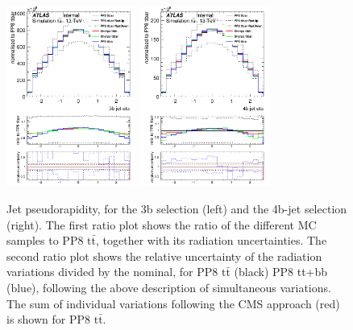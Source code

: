 \begin{figure}[!htb]
\centering
\includegraphics[width=0.38\textwidth]{Plots/ttbb/his3b_jeteta__div}
\includegraphics[width=0.38\textwidth]{Plots/ttbb/his4b_jeteta__div}
  \caption{Jet pseudorapidity, for the 3b selection (left) and the 4b-jet selection (right). The first ratio plot shows the ratio of the different MC samples to PP8 $\mathrm{t\bar{t}}$, together with its radiation uncertainties. The second ratio plot shows the relative uncertainty of the radiation variations divided by the nominal, for PP8 $\mathrm{t\bar{t}}$ (black) PP8 tt+bb (blue), following the above description of simultaneous variations. The sum of individual variations following the CMS approach (red) is shown for PP8 $\mathrm{t\bar{t}}$. \label{ttbb:jeteta}}
\end{figure}